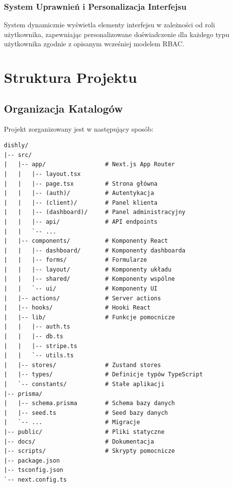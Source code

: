 \documentclass[12pt,a4paper,utf-8]{article}
\begin{document}
\subsubsection{System Uprawnień i Personalizacja Interfejsu}

System dynamicznie wyświetla elementy interfejsu w zależności od roli użytkownika, zapewniając personalizowane doświadczenie dla każdego typu użytkownika zgodnie z opisanym wcześniej modelem RBAC.

\newpage

\newpage

\section{Struktura Projektu}

\subsection{Organizacja Katalogów}

Projekt zorganizowany jest w następujący sposób:

\begin{verbatim}
dishly/
|-- src/
|   |-- app/                 # Next.js App Router
|   |   |-- layout.tsx
|   |   |-- page.tsx         # Strona główna
|   |   |-- (auth)/          # Autentykacja
|   |   |-- (client)/        # Panel klienta
|   |   |-- (dashboard)/     # Panel administracyjny
|   |   |-- api/             # API endpoints
|   |   `-- ...
|   |-- components/          # Komponenty React
|   |   |-- dashboard/       # Komponenty dashboarda
|   |   |-- forms/           # Formularze
|   |   |-- layout/          # Komponenty układu
|   |   |-- shared/          # Komponenty wspólne
|   |   `-- ui/              # Komponenty UI
|   |-- actions/             # Server actions
|   |-- hooks/               # Hooki React
|   |-- lib/                 # Funkcje pomocnicze
|   |   |-- auth.ts
|   |   |-- db.ts
|   |   |-- stripe.ts
|   |   `-- utils.ts
|   |-- stores/              # Zustand stores
|   |-- types/               # Definicje typów TypeScript
|   `-- constants/           # Stałe aplikacji
|-- prisma/
|   |-- schema.prisma        # Schema bazy danych
|   |-- seed.ts              # Seed bazy danych
|   `-- ...                  # Migracje
|-- public/                  # Pliki statyczne
|-- docs/                    # Dokumentacja
|-- scripts/                 # Skrypty pomocnicze
|-- package.json
|-- tsconfig.json
`-- next.config.ts
\end{verbatim}
\end{document}
